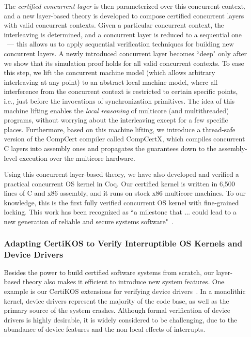 \documentclass[a4paper, 10pt]{article}
\begin{document}
\begin{small}
The \emph{certified concurrent layer}  is then parameterized over this concurrent context,
and a new layer-based theory is developed to 
compose certified concurrent layers with valid concurrent contexts.
Given a particular concurrent context,
the interleaving is determined,
and a concurrent layer is reduced to a sequential one ~--- this allows us to apply sequential verification techniques for
building new concurrent layers.
A newly introduced concurrent layer becomes ``deep" only after we show that its simulation proof holds for all valid concurrent contexts.
To ease this step, we lift the concurrent machine model (which allows arbitrary interleaving at any point) to an abstract local machine model,
where all interference from the concurrent context is restricted to
 certain specific points, i.e.,
just before the invocations of synchronization primitives. The idea of this machine lifting
enables the \emph{local reasoning} of multicore (and multithreaded) programs,
without worrying about the  interleaving except for a few specific places. 
Furthermore, based on this machine lifting,
we introduce a thread-safe version of
the CompCert compiler called CompCertX, which compiles concurrent C layers
into assembly ones and 
propagates the guarantees down to the assembly-level execution over the multicore hardware.
 
Using this concurrent layer-based theory,
we have also developed and verified a practical concurrent OS
kernel in Coq. Our certified kernel is written in 6,500 lines of
C and x86 assembly, and it runs on stock x86 multicore
machines. To our knowledge, this is the first fully verified concurrent
OS kernel  with fine-grained locking.
This work has been recognized as ``a milestone that ... could lead to a new generation of reliable and secure systems software"~\cite{news}.

\subsubsection*{\small Adapting CertiKOS to Verify Interruptible OS Kernels and Device Drivers}
Besides the power to build certified software systems from  scratch, our layer-based theory also makes it efficient to introduce new system features.  
One example is our CertiKOS extensions for verifying device drivers~\cite{pldi16-device}.
In a monolithic kernel,
device drivers represent the majority of the code base, as well as the primary source of the system crashes.
Although formal verification of device drivers is highly desirable, it is widely considered to be challenging, due to the abundance of device features
and the non-local effects of interrupts.


\end{small}
\end{document}
